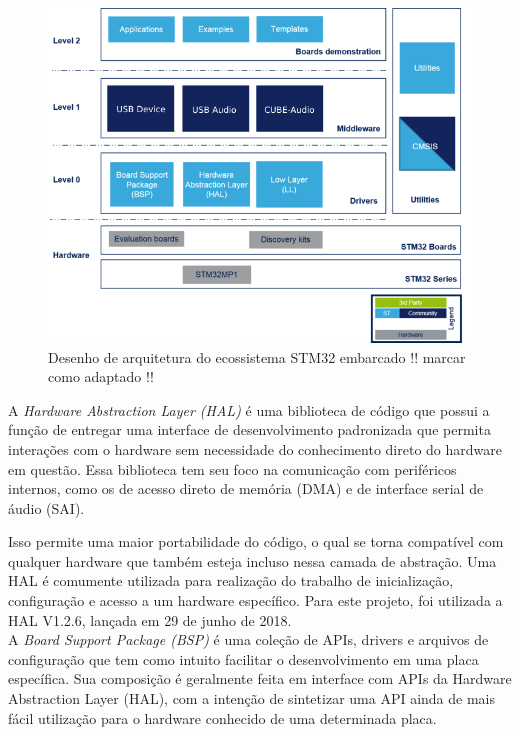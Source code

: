 \begin{figure}[!h]
  \includegraphics[scale=0.5]{figuras/stm32-architecture.png}
  \caption{Desenho de arquitetura do ecossistema STM32 embarcado !! marcar como adaptado !!}
\end{figure}

A \textit{Hardware Abstraction Layer (HAL)} é uma biblioteca de código que possui a função de entregar uma interface de desenvolvimento padronizada que permita interações com o hardware sem necessidade do conhecimento direto do hardware em questão. Essa biblioteca tem seu foco na comunicação com periféricos internos, como os de acesso direto de memória (DMA) e de interface serial de áudio (SAI).

Isso permite uma maior portabilidade do código, o qual se torna compatível com qualquer hardware que também esteja incluso nessa camada de abstração.
Uma HAL é comumente utilizada para realização do trabalho de inicialização, configuração e acesso a um hardware específico. Para este projeto, foi utilizada a HAL V1.2.6, lançada em 29 de junho de 2018.
\\[10pt]

A \textit{Board Support Package (BSP)} é uma coleção de APIs, drivers e arquivos de configuração que tem como intuito facilitar o desenvolvimento em uma placa específica. Sua composição é geralmente feita em interface com APIs da Hardware Abstraction Layer (HAL), com a intenção de sintetizar uma API ainda de mais fácil utilização para o hardware conhecido de uma determinada placa.

